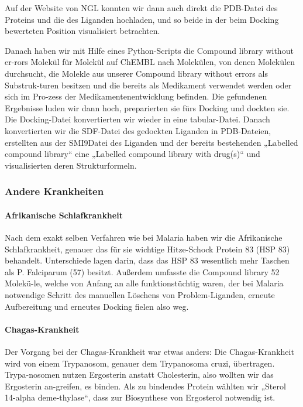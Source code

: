 \documentclass[11pt]{article}
\begin{document}
    Auf der Website von NGL konnten wir dann auch direkt die PDB-Datei des Proteins und die des Liganden hochladen, und so beide in der beim Docking bewerteten Position visualisiert betrachten.

    Danach haben wir mit Hilfe eines Python-Scripts die Compound library without er-rors Molekül für Molekül auf ChEMBL nach Molekülen, von denen Molekülen durchsucht, die Molekle aus unserer Compound library without errors als Substruk-turen besitzen und die bereits als Medikament verwendet werden oder sich im Pro-zess der Medikamentenentwicklung befinden. Die gefundenen Ergebnisse luden wir dann hoch, preparierten sie fürs Docking und dockten sie. Die Docking-Datei konvertierten wir wieder in eine tabular-Datei. Danach konvertierten wir die SDF-Datei des gedockten Liganden in PDB-Dateien, erstellten aus der SMI9Datei des Liganden und der bereits bestehenden „Labelled compound library“ eine „Labelled compound library with drug(s)“ und visualisierten deren Strukturformeln.

    


    \subsubsection{Andere Krankheiten}

    \paragraph{Afrikanische Schlafkrankheit}
    Nach dem exakt selben Verfahren wie bei Malaria haben wir die Afrikanische Schlafkrankheit, genauer das für sie wichtige Hitze-Schock Protein 83 (HSP 83) behandelt. Unterschiede lagen darin, dass das HSP 83 wesentlich mehr Taschen als P. Falciparum (57) besitzt. Außerdem umfasste die Compound library 52 Molekü-le, welche von Anfang an alle funktionstüchtig waren, der bei Malaria notwendige Schritt des manuellen Löschens von Problem-Liganden, erneute Aufbereitung und erneutes Docking fielen also weg.

    \paragraph{Chagas-Krankheit}
    Der Vorgang bei der Chagas-Krankheit war etwas anders: Die Chagas-Krankheit wird von einem Trypanosom, genauer dem Trypanosoma cruzi, übertragen. Trypa-nosomen nutzen Ergosterin anstatt Cholesterin, also wollten wir das Ergosterin an-greifen, es binden. Als zu bindendes Protein wählten wir „Sterol 14-alpha deme-thylase“, dass zur Biosynthese von Ergosterol notwendig ist.
\end{document}
